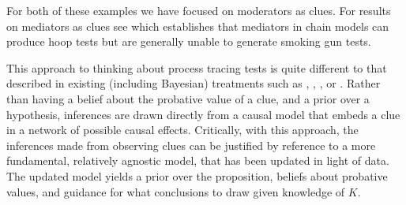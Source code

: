 \documentclass[
  12pt,
]{book}
\begin{document}
\begin{table}

\caption{\label{tab:testsfinite}Classic tests with probative value inferred from (simulated) data, for query, Does $X$ have a positive effect on $Y$ in this case?}
\centering
{}
\end{table}

For both of these examples we have focused on moderators as clues. For results on mediators as clues see \citet{dawid2019bounding} which establishes that mediators in chain models can produce hoop tests but are generally unable to generate smoking gun tests.

This approach to thinking about process tracing tests is quite different to that described in existing (including Bayesian) treatments such as \citet{collier2011understanding}, \citet{BennettAppendix}, \citet{fairfield2017explicit}, or \citet{humphreys2015mixing}. Rather than having a belief about the probative value of a clue, and a prior over a hypothesis, inferences are drawn directly from a causal model that embeds a clue in a network of possible causal effects. Critically, with this approach, the inferences made from observing clues can be justified by reference to a more fundamental, relatively agnostic model, that has been updated in light of data. The updated model yields a prior over the proposition, beliefs about probative values, and guidance for what conclusions to draw given knowledge of \(K\).
\end{document}
